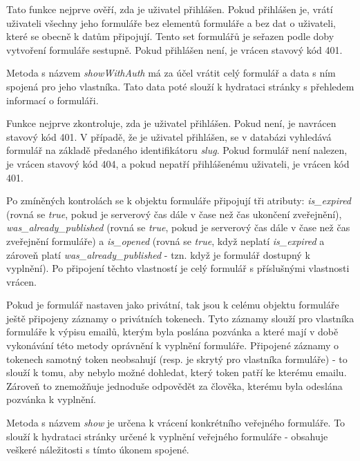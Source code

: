 			Tato funkce nejprve ověří, zda je uživatel přihlášen. Pokud přihlášen je, vrátí uživateli všechny jeho formuláře bez elementů formuláře a bez dat o uživateli, které se obecně k datům připojují. Tento set formulářů je seřazen podle doby vytvoření formuláře sestupně. Pokud přihlášen není, je vrácen stavový kód 401. 
			
			\label{sec:form_showwithauth}
			Metoda s názvem \textit{showWithAuth} má za účel vrátit celý formulář a data s ním spojená pro jeho vlastníka. Tato data poté slouží k hydrataci stránky s přehledem informací o formuláři.
			
			Funkce nejprve zkontroluje, zda je uživatel přihlášen. Pokud není, je navrácen stavový kód 401. V případě, že je uživatel přihlášen, se v databázi vyhledává formulář na základě předaného identifikátoru \textit{slug}. Pokud formulář není nalezen, je vrácen stavový kód 404, a pokud nepatří přihlášenému uživateli, je vrácen kód 401. 
			
			Po zmíněných kontrolách se k objektu formuláře připojují tři atributy: \textit{is\_expired} (rovná se \textit{true}, pokud je serverový čas dále v čase než čas ukončení zveřejnění), \textit{was\_already\_published} (rovná se \textit{true}, pokud je serverový čas dále v čase než čas zveřejnění formuláře) a \textit{is\_opened} (rovná se \textit{true}, když neplatí \textit{is\_expired} a zároveň platí \textit{was\_already\_published} - tzn. když je formulář dostupný k vyplnění). Po připojení těchto vlastností je celý formulář s příslušnými vlastnosti vrácen.
			
			Pokud je formulář nastaven jako privátní, tak jsou k celému objektu formuláře ještě připojeny záznamy o privátních tokenech. Tyto záznamy slouží pro vlastníka formuláře k výpisu emailů, kterým byla poslána pozvánka a které mají v době vykonávání této metody oprávnění k vyplnění formuláře. Připojené záznamy o tokenech samotný token neobsahují (resp. je skrytý pro vlastníka formuláře) - to slouží k tomu, aby nebylo možné dohledat, který token patří ke kterému emailu. Zároveň to znemožňuje jednoduše odpovědět za člověka, kterému byla odeslána pozvánka k vyplnění.
			
			\label{sec:form_show}
			Metoda s názvem \textit{show} je určena k vrácení konkrétního veřejného formuláře. To slouží k hydrataci stránky určené k vyplnění veřejného formuláře - obsahuje veškeré náležitosti s tímto úkonem spojené.
			

